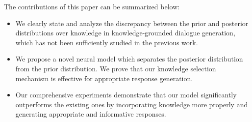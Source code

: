 \documentclass{article}
\begin{document}
%
%
%
%
%

The contributions of this paper can be summarized below:
\begin{itemize}
    \item We clearly state and analyze the discrepancy between the prior and posterior distributions over knowledge in knowledge-grounded dialogue generation, 
    which has not been sufficiently studied in the previous work.
    \item We propose a novel neural model which separates the posterior distribution from the prior distribution.
    We prove that our knowledge selection mechanism is effective for appropriate response generation.
    \item Our comprehensive experiments demonstrate that our model significantly outperforms the existing ones by incorporating knowledge more properly and generating appropriate and informative responses.
\end{itemize}
\end{document}
